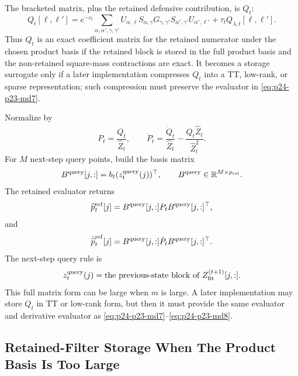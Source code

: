 \documentclass[11pt]{article}
\numberwithin{equation}{section}
\newcommand{\R}{\mathbb R}
\begin{document}
The bracketed matrix, plus the retained defensive contribution, is \(Q_t\):
\begin{equation}
    Q_t[\ell,\ell']
    =
    e^{-c_t}
    \sum_{\alpha,\alpha',\gamma,\gamma'}
    U_{\alpha,\ell}S_{\alpha,\gamma}
    G_{\gamma,\gamma'}
    S_{\alpha',\gamma'}U_{\alpha',\ell'}
    +
    \tau_t Q_{\lambda,t}[\ell,\ell'].
    \label{eq:p24-p23-md4e}
\end{equation}
Thus \(Q_t\) is an exact coefficient matrix for the retained numerator under
the chosen product basis if the retained block is stored in the full product
basis and the non-retained square-mass contractions are exact.  It becomes a
storage surrogate only if a later implementation compresses \(Q_t\) into a TT,
low-rank, or sparse representation; such compression must preserve the
evaluator in \eqref{eq:p24-p23-md7}.

Normalize by
\begin{equation}
    P_t=\frac{Q_t}{\widehat Z_t},
    \qquad
    \dot P_t=
    \frac{\dot Q_t}{\widehat Z_t}
    -
    \frac{Q_t\dot{\widehat Z}_t}{\widehat Z_t^2}.
    \label{eq:p24-p23-md5}
\end{equation}
For \(M\) next-step query points, build the basis matrix
\begin{equation}
    B^{\rm query}[j,:]=b_t(z_t^{\rm query}(j))^\top,
    \qquad
    B^{\rm query}\in\R^{M\times p_{\rm ret}}.
    \label{eq:p24-p23-md6}
\end{equation}
The retained evaluator returns
\begin{equation}
    \widehat p_t^{\rm ref}[j]
    =
    B^{\rm query}[j,:]P_tB^{\rm query}[j,:]^\top,
    \label{eq:p24-p23-md7}
\end{equation}
and
\begin{equation}
    \dot{\widehat p}_t^{\rm ref}[j]
    =
    B^{\rm query}[j,:]\dot P_tB^{\rm query}[j,:]^\top.
    \label{eq:p24-p23-md8}
\end{equation}
The next-step query rule is
\begin{equation}
    z_t^{\rm query}(j)
    =
    \text{the previous-state block of }Z_{\rm fit}^{(t+1)}[j,:].
    \label{eq:p24-p23-md9}
\end{equation}
This full matrix form can be large when \(m\) is large.  A later
implementation may store \(Q_t\) in TT or low-rank form, but then it must
provide the same evaluator and derivative evaluator as \eqref{eq:p24-p23-md7}--\eqref{eq:p24-p23-md8}.

\subsection*{Retained-Filter Storage When The Product Basis Is Too Large}
\end{document}
